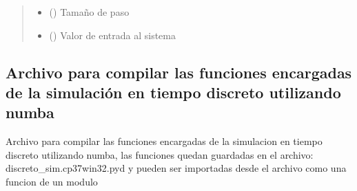 \documentclass[letterpaper,10pt,spanish]{sphinxmanual}
\begin{document}
\begin{fulllineitems}
\begin{quote}
\begin{description}
\begin{itemize}
\item {} 
 () \textendash{} Tamaño de paso

\item {} 
 () \textendash{} Valor de entrada al sistema

\end{itemize}

\end{description}\end{quote}

\end{fulllineitems}



\subsection{Archivo para compilar las funciones encargadas de la simulación en tiempo discreto utilizando numba}
\label{\detokenize{codigos/discreto_generator:archivo-para-compilar-las-funciones-encargadas-de-la-simulacion-en-tiempo-discreto-utilizando-numba}}\label{\detokenize{codigos/discreto_generator::doc}}\label{\detokenize{codigos/discreto_generator:module-discreto_generator}}
Archivo para compilar las funciones encargadas de la simulacion en tiempo discreto utilizando numba, las funciones quedan guardadas en el archivo: discreto\_sim.cp37\sphinxhyphen{}win32.pyd y pueden ser importadas desde el archivo como una funcion de un modulo
\end{document}
